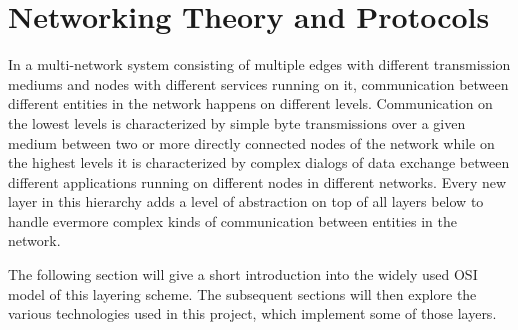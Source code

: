 \section{Networking Theory and Protocols}
In a multi-network system consisting of multiple edges with different transmission mediums and nodes with different services running on it, communication between different entities in the network happens on different levels. Communication on the lowest levels is characterized by simple byte transmissions over a given medium between two or more directly connected nodes of the network while on the highest levels it is characterized by complex dialogs of data exchange between different applications running on different nodes in different networks. Every new layer in this hierarchy adds a level of abstraction on top of all layers below to handle evermore complex kinds of communication between entities in the network.

The following section will give a short introduction into the widely used OSI model of this layering scheme. The subsequent sections will then explore the various technologies used in this project, which implement some of those layers.

